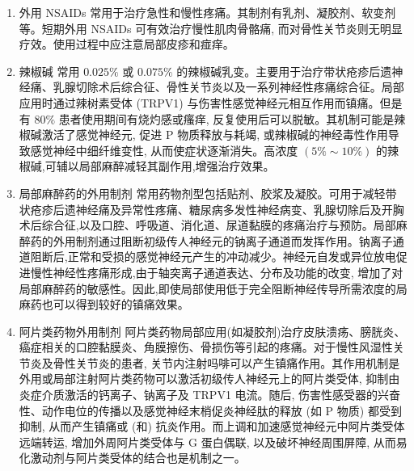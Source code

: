 \documentclass[10pt]{article}
\begin{document}
\begin{enumerate}
  \item 外用 NSAIDs 常用于治疗急性和慢性疼痛。其制剂有乳剂、凝胶剂、软变剂等。短期外用 NSAIDs 可有效治疗慢性肌肉骨骼痛, 而对骨性关节炎则无明显疗效。使用过程中应注意局部皮疹和痖痒。

  \item 辣椒碱 常用 $0.025 \%$ 或 $0.075 \%$ 的辣椒碱乳变。主要用于治疗带状疮疹后遗神经痛、乳腺切除术后综合征、骨性关节炎以及一系列神经性疼痛综合征。局部应用时通过辣树素受体 (TRPV1) 与伤害性感觉神经元相互作用而镇痛。但是有 $80 \%$ 患者使用期间有烧灼感或瘙痒, 反复使用后可以脱敏。其机制可能是辣椒碱激活了感觉神经元, 促进 $\mathrm{P}$ 物质释放与耗竭, 或辣椒碱的神经毒性作用导致感觉神经中细纤维变性, 从而使症状逐渐消失。高浓度 $(5 \% \sim 10 \%)$ 的辣椒碱,可辅以局部麻醉减轻其副作用,增强治疗效果。

  \item 局部麻醉药的外用制剂 常用药物剂型包括贴剂、胶浆及凝胶。可用于减轻带状疮疹后遗神经痛及异常性疼痛、糖尿病多发性神经病变、乳腺切除后及开胸术后综合征,以及口腔、呼吸道、消化道、尿道黏膜的疼痛治疗与预防。局部麻醉药的外用制剂通过阻断初级传人神经元的钠离子通道而发挥作用。钠离子通道阻断后,正常和受损的感觉神经元产生的冲动减少。神经元自发或异位放电促进慢性神经性疼痛形成,由于轴突离子通道表达、分布及功能的改变, 增加了对局部麻醉药的敏感性。因此,即使局部使用低于完全阻断神经传导所需浓度的局麻药也可以得到较好的镇痛效果。

  \item 阿片类药物外用制剂 阿片类药物局部应用(如凝胶剂)治疗皮肤溃疡、膀胱炎、癌症相关的口腔黏膜炎、角膜擦伤、骨损伤等引起的疼痛。对于慢性风湿性关节炎及骨性关节炎的患者, 关节内注射吗啡可以产生镇痛作用。其作用机制是外用或局部注射阿片类药物可以激活初级传人神经元上的阿片类受体, 抑制由炎症介质激活的钙离子、钠离子及 TRPV1 电流。随后, 伤害性感受器的兴奋性、动作电位的传播以及感觉神经末梢促炎神经肽的释放 (如 $\mathrm{P}$ 物质) 都受到抑制, 从而产生镇痛或 (和) 抗炎作用。而上调和加速感觉神经元中阿片类受体远端转运, 增加外周阿片类受体与 $\mathrm{G}$ 蛋白偶联, 以及破坏神经周围屏障, 从而易化激动剂与阿片类受体的结合也是机制之一。

\end{enumerate}
\end{document}
